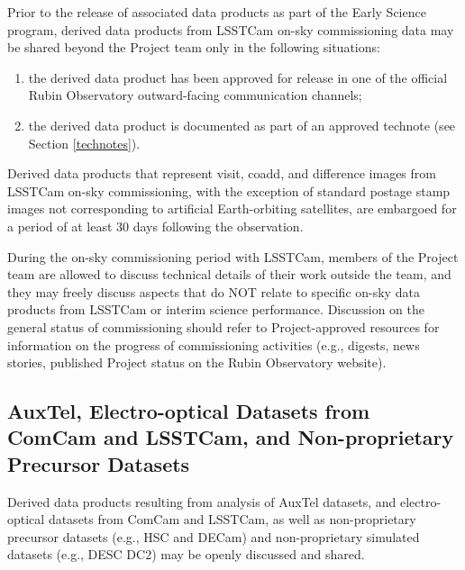 \documentclass[SE,authoryear,toc,lsstdraft]{lsstdoc}
\begin{document}
Prior to the release of associated data products as part of the Early Science program, derived data products from LSSTCam on-sky commissioning data may be shared beyond the Project team only in the following situations:

\begin{enumerate}

  \item the derived data product has been approved for release in one of the official Rubin Observatory outward-facing communication channels;

  \item the derived data product is documented as part of an approved technote (see Section \ref{technotes}).

\end{enumerate}

Derived data products that represent visit, coadd, and difference images from LSSTCam on-sky commissioning, with the exception of standard postage stamp images not corresponding to artificial Earth-orbiting satellites, are embargoed for a period of at least 30 days following the observation.


During the on-sky commissioning period with LSSTCam, members of the Project team are allowed to discuss technical details of their work outside the team, and they may freely discuss aspects that do NOT relate to specific on-sky data products from LSSTCam or interim science performance.
Discussion on the general status of commissioning should refer to Project-approved resources for information on the progress of commissioning activities (e.g., digests, news stories, published Project status on the Rubin Observatory website).

\subsection{AuxTel, Electro-optical Datasets from ComCam and LSSTCam, and Non-proprietary Precursor Datasets}

Derived data products resulting from analysis of AuxTel datasets, and electro-optical datasets from ComCam and LSSTCam, as well as non-proprietary precursor datasets (e.g., HSC and DECam) and non-proprietary simulated datasets (e.g., DESC DC2) may be openly discussed and shared.

\end{document}

